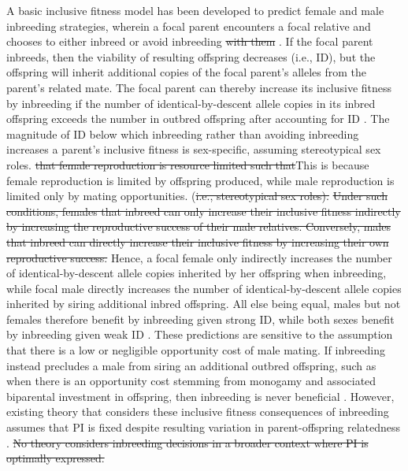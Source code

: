 \documentclass[12pt]{article}
\begin{document}
A basic inclusive fitness model has been developed to predict female and male inbreeding strategies, wherein a focal parent encounters a focal relative and chooses to either inbreed or avoid inbreeding {\color{red}\st{with them}} \cite[][]{Parker1979, Parker2006, Kokko2006, Duthie2015a}. If the focal parent inbreeds, then the viability of resulting offspring decreases (i.e., ID), but the offspring will inherit additional copies of the focal parent's alleles from the parent's related mate. The focal parent can thereby increase its inclusive fitness by inbreeding if the number of identical-by-descent allele copies in its inbred offspring exceeds the number in outbred offspring after accounting for ID \cite[][]{Parker1979, Parker2006, Kokko2006, Szulkin2012, Duthie2015a}. The magnitude of ID below which inbreeding rather than avoiding inbreeding increases a parent's inclusive fitness is sex-specific, assuming {\color{blue}stereotypical sex roles.} {\color{red}\st{that female reproduction is resource limited such that}}{\color{blue}This is because female reproduction is limited by offspring produced}, while male reproduction is limited only by mating opportunities. {\color{red}(\st{i.e., stereotypical sex roles).}} {\color{red}\st{Under such conditions, females that inbreed can only increase their inclusive fitness indirectly by increasing the reproductive success of their male relatives. Conversely, males that inbreed can directly increase their inclusive fitness by increasing their own reproductive success.}} {\color{blue}Hence, a focal female only indirectly increases the number of identical-by-descent allele copies inherited by her offspring when inbreeding, while focal male directly increases the number of identical-by-descent allele copies inherited by siring additional inbred offspring.} All else being equal, males but not females therefore benefit by inbreeding given strong ID, while both sexes benefit by inbreeding given weak ID \cite[][]{Parker1979, Parker2006, Kokko2006, Duthie2015a}. These predictions are sensitive to the assumption that there is a low or negligible opportunity cost of male mating. If inbreeding instead precludes a male from siring an additional outbred offspring, such as when there is an opportunity cost stemming from monogamy and associated biparental investment in offspring, then inbreeding is never beneficial \cite[][]{Waser1986}. However, existing theory that considers these inclusive fitness consequences of inbreeding assumes that PI is fixed despite resulting variation in parent-offspring relatedness \cite[][]{Trivers1974, Lynch1998, Reid2016}. {\color{red}\st{No theory considers inbreeding decisions in a broader context where PI is optimally expressed.}}
\end{document}
